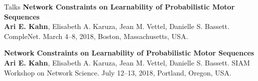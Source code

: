 \documentclass{resume} %
\begin{document}
\begin{rSection}{Talks}
\textbf{Network Constraints on Learnability of Probabilistic Motor Sequences} \\
\textbf{Ari E. Kahn}, Elisabeth A. Karuza, Jean M. Vettel, Danielle S. Bassett.
CompleNet. March 4--8, 2018, Boston, Massachusetts, USA.

\textbf{Network Constraints on Learnability of Probabilistic Motor Sequences} \\
\textbf{Ari E. Kahn}, Elisabeth A. Karuza, Jean M. Vettel, Danielle S. Bassett.
SIAM Workshop on Network Science. July 12--13, 2018, Portland, Oregon, USA.
\end{rSection}
\end{document}
